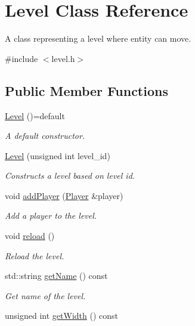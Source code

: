 \hypertarget{classLevel}{}\section{Level Class Reference}
\label{classLevel}


A class representing a level where entity can move.  




{\ttfamily \#include $<$level.\+h$>$}

\subsection*{Public Member Functions}
\begin{DoxyCompactItemize}
\item 
\hyperlink{classLevel_ac1c79fc13a67584d22e3d7295cd3cc9d}{Level} ()=default
\begin{DoxyCompactList}\small\item\em A default constructor. \end{DoxyCompactList}\item 
\hyperlink{classLevel_a8fc569ff48384440a513dfc188d4f96d}{Level} (unsigned int level\+\_\+id)
\begin{DoxyCompactList}\small\item\em Constructs a level based on level id. \end{DoxyCompactList}\item 
void \hyperlink{classLevel_a403167dadfaccc9f5d9269845bcda34f}{add\+Player} (\hyperlink{classPlayer}{Player} \&player)
\begin{DoxyCompactList}\small\item\em Add a player to the level. \end{DoxyCompactList}\item 
void \hyperlink{classLevel_a9a1fb164259e6a8c91410ed992a8b878}{reload} ()
\begin{DoxyCompactList}\small\item\em Reload the level. \end{DoxyCompactList}\item 
std\+::string \hyperlink{classLevel_a0b6dd5b18919a849c374b67625a849fb}{get\+Name} () const
\begin{DoxyCompactList}\small\item\em Get name of the level. \end{DoxyCompactList}\item 
unsigned int \hyperlink{classLevel_ab37b554aa2379fb9c99fa4c83eef1823}{get\+Width} () const

\end{DoxyCompactItemize}
